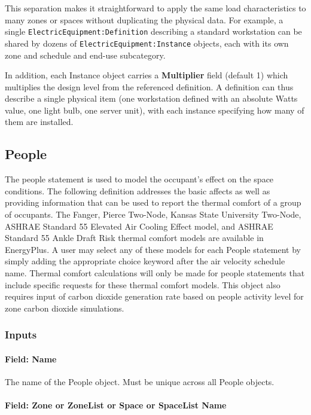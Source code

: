 This separation makes it straightforward to apply the same load characteristics to many zones or spaces without duplicating the physical data. For example, a single \texttt{ElectricEquipment:Definition} describing a standard workstation can be shared by dozens of \texttt{ElectricEquipment:Instance} objects, each with its own zone and schedule and end-use subcategory.


In addition, each Instance object carries a \textbf{Multiplier} field (default 1) which multiplies the design level from the referenced definition. A definition can thus describe a single physical item (one workstation defined with an absolute Watts value, one light bulb, one server unit), with each instance specifying how many of them are installed.

\subsection{People}\label{people}

The people statement is used to model the occupant's effect on the space conditions. The following definition addresses the basic affects as well as providing information that can be used to report the thermal comfort of a group of occupants. The Fanger, Pierce Two-Node, Kansas State University Two-Node, ASHRAE Standard 55 Elevated Air Cooling Effect model, and ASHRAE Standard 55 Ankle Draft Risk thermal comfort models are available in EnergyPlus. A user may select any of these models for each People statement by simply adding the appropriate choice keyword after the air velocity schedule name. Thermal comfort calculations will only be made for people statements that include specific requests for these thermal comfort models. This object also requires input of carbon dioxide generation rate based on people activity level for zone carbon dioxide simulations.

\subsubsection{Inputs}\label{inputs-025}

\paragraph{Field: Name}\label{field-name-024}

The name of the People object. Must be unique across all People objects.

\paragraph{Field: Zone or ZoneList or Space or SpaceList Name}\label{field-zone-or-zonelist-name-000}

